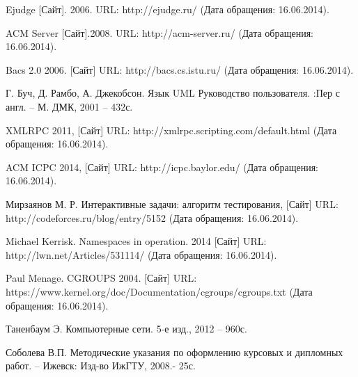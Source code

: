 \begin{thebibliography}{9}

Ejudge [Сайт]. 2006. URL: http://ejudge.ru/ (Дата обращения: 16.06.2014).

ACM Server [Сайт].2008. URL: http://acm-server.ru/ (Дата обращения: 16.06.2014).

Bacs 2.0 2006. [Сайт] URL: http://bacs.cs.istu.ru/ (Дата обращения: 16.06.2014).

Г. Буч, Д. Рамбо, А. Джекобсон. Язык UML Руководство пользователя. :Пер с англ. – М. ДМК, 2001 – 432с.

XMLRPC 2011, [Сайт] URL: http://xmlrpc.scripting.com/default.html (Дата обращения: 16.06.2014).

ACM ICPC 2014, [Сайт] URL: http://icpc.baylor.edu/ (Дата обращения: 16.06.2014).

Мирзаянов М. Р. Интерактивные задачи: алгоритм тестирования, [Сайт] URL: http://codeforces.ru/blog/entry/5152 (Дата обращения: 16.06.2014).

Michael Kerrisk. Namespaces in operation. 2014 [Сайт] URL: http://lwn.net/Articles/531114/ (Дата обращения: 16.06.2014).

Paul Menage. CGROUPS 2004. [Сайт] URL: https://www.kernel.org/doc/Documentation/cgroups/cgroups.txt (Дата обращения: 16.06.2014).

Таненбаум Э. Компьютерные сети. 5-е изд., 2012 -- 960с.

Соболева В.П. Методические указания по оформлению курсовых и дипломных работ. – Ижевск: Изд-во ИжГТУ, 2008.- 25с.

\end{thebibliography}

